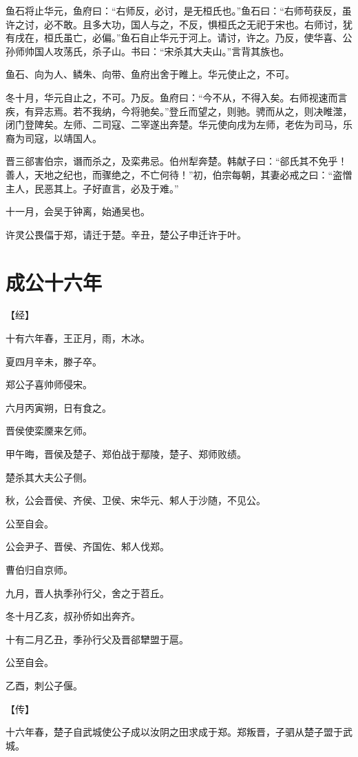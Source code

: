 \documentclass[a4paper,12pt,UTF8,twoside]{ctexbook}
\begin{document}
鱼石将止华元，鱼府曰：“右师反，必讨，是无桓氏也。”鱼石曰：“右师苟获反，虽许之讨，必不敢。且多大功，国人与之，不反，惧桓氏之无祀于宋也。右师讨，犹有戌在，桓氏虽亡，必偏。”鱼石自止华元于河上。请讨，许之。乃反，使华喜、公孙师帅国人攻荡氏，杀子山。书曰：“宋杀其大夫山。”言背其族也。

鱼石、向为人、鳞朱、向带、鱼府出舍于睢上。华元使止之，不可。

冬十月，华元自止之，不可。乃反。鱼府曰：“今不从，不得入矣。右师视速而言疾，有异志焉。若不我纳，今将驰矣。”登丘而望之，则驰。骋而从之，则决睢澨，闭门登陴矣。左师、二司寇、二宰遂出奔楚。华元使向戌为左师，老佐为司马，乐裔为司寇，以靖国人。

晋三郤害伯宗，谮而杀之，及栾弗忌。伯州犁奔楚。韩献子曰：“郤氏其不免乎！善人，天地之纪也，而骤绝之，不亡何待！”初，伯宗每朝，其妻必戒之曰：“盗憎主人，民恶其上。子好直言，必及于难。”

十一月，会吴于钟离，始通吴也。

许灵公畏偪于郑，请迁于楚。辛丑，楚公子申迁许于叶。

\section{成公十六年}



【经】

十有六年春，王正月，雨，木冰。

夏四月辛未，滕子卒。

郑公子喜帅师侵宋。

六月丙寅朔，日有食之。

晋侯使栾黡来乞师。

甲午晦，晋侯及楚子、郑伯战于鄢陵，楚子、郑师败绩。

楚杀其大夫公子侧。

秋，公会晋侯、齐侯、卫侯、宋华元、邾人于沙随，不见公。

公至自会。

公会尹子、晋侯、齐国佐、邾人伐郑。

曹伯归自京师。

九月，晋人执季孙行父，舍之于苕丘。

冬十月乙亥，叔孙侨如出奔齐。

十有二月乙丑，季孙行父及晋郤犫盟于扈。

公至自会。

乙酉，刺公子偃。

【传】

十六年春，楚子自武城使公子成以汝阴之田求成于郑。郑叛晋，子驷从楚子盟于武城。
\end{document}
